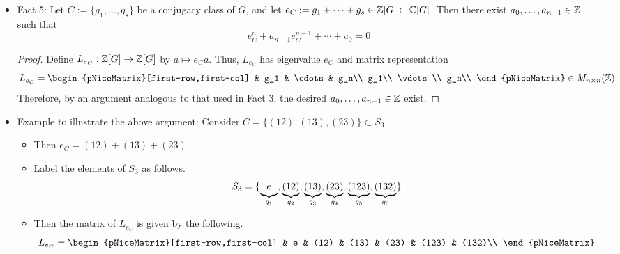 \documentclass[../notes.tex]{subfiles}
\begin{document}
\begin{itemize}
\begin{itemize}
\begin{itemize}
        \end{itemize}
    \end{itemize}
    \item Fact 5: Let $C:=\{g_1,\dots,g_s\}$ be a conjugacy class of $G$, and let $e_C:=g_1+\cdots+g_s\in\mathbb{Z}[G]\subset\mathbb{C}[G]$. Then there exist $a_0,\dots,a_{n-1}\in\mathbb{Z}$ such that
    \begin{equation*}
        e_C^n+a_{n-1}e_C^{n-1}+\cdots+a_0 = 0
    \end{equation*}
    \begin{proof}
        Define $L_{e_C}:\mathbb{Z}[G]\to\mathbb{Z}[G]$ by $a\mapsto e_Ca$. Thus, $L_{e_C}$ has eigenvalue $e_C$ and matrix representation
        \begin{equation*}
            L_{e_C} =
            \begin{pNiceMatrix}[first-row,first-col]
                & g_1 & \cdots & g_n\\
                g_1\\
                \vdots\\
                g_n\\
            \end{pNiceMatrix}
            \in M_{n\times n}(\Z)
        \end{equation*}
        Therefore, by an argument analogous to that used in Fact 3, the desired $a_0,\dots,a_{n-1}\in\mathbb{Z}$ exist.
    \end{proof}
    \item Example to illustrate the above argument: Consider $C=\{(12),(13),(23)\}\subset S_3$.
    \begin{itemize}
        \item Then $e_C=(12)+(13)+(23)$.
        \item Label the elements of $S_3$ as follows.
        \begin{equation*}
            S_3 = \{\underbrace{\vphantom{(}e}_{g_1},\underbrace{(12)}_{g_2},\underbrace{(13)}_{g_3},\underbrace{(23)}_{g_4},\underbrace{(123)}_{g_5},\underbrace{(132)}_{g_6}\}
        \end{equation*}
        \item Then the matrix of $L_{e_C}$ is given by the following.
        \begin{equation*}
            L_{e_C} =
            \begin{pNiceMatrix}[first-row,first-col]
                      & e & (12) & (13) & (23) & (123) & (132)\\

\end{pNiceMatrix}
\end{equation*}
\end{itemize}
\end{itemize}
\end{document}
